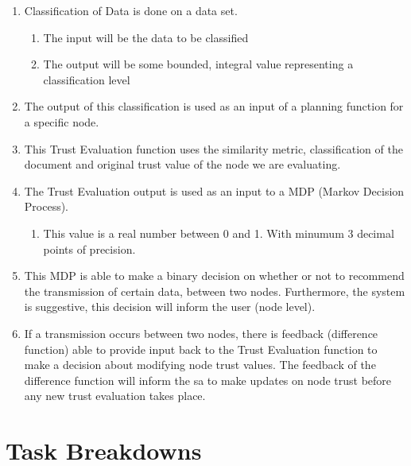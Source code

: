 \begin{enumerate}
    \item Classification of Data is done on a data set.
        \begin{enumerate}
            \item The input will be the data to be classified
            \item The output will be some bounded, integral value representing a classification level
        \end{enumerate}
    \item The output of this classification is used as an input of a planning function for a specific node.
    \item This Trust Evaluation function uses the similarity metric,
        classification of the document and original trust value of the node we
        are evaluating.
    \item The Trust Evaluation output is used as an input to a MDP (Markov Decision Process). 
        \begin{enumerate}
            \item This value is a real number between 0 and 1. With minumum 3 decimal points of precision.
        \end{enumerate}
    \item This MDP is able to make a binary decision on whether or not to
        recommend the transmission of certain data, between two nodes.
    Furthermore, the system is suggestive, this decision will inform the user
(node level).  
    \item If a transmission occurs between two nodes, there is feedback
        (difference function) able to provide input back to the Trust
    Evaluation function to make a decision about modifying node trust values.
    The feedback of the difference function will inform the \gls{sa} to make updates on node
    trust before any new trust evaluation takes place.  
    
    \end{enumerate}

\FloatBarrier
\section{Task Breakdowns}

